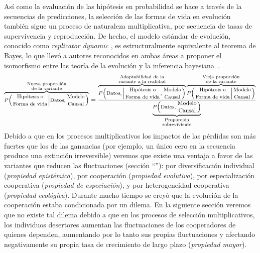 \documentclass[a4paper,11pt]{book}
\newcommand\hfrac[2]{\genfrac{}{}{0pt}{}{#1}{#2}} %
\theoremstyle{definition}
\begin{document}
Así como la evaluación de las hipótesis en probabilidad se hace a través de la secuencias de predicciones, la selección de las formas de vida en evolución también sigue un proceso de naturaleza multiplicativa, por secuencia de tasas de supervivencia y reproducción.
%
De hecho, el modelo estándar de evolución, conocido como \emph{replicator dynamic} \cite{taylor1978-replicatorDynamic}, es estructuralmente equivalente al teorema de Bayes, lo que llevó a autores reconocidos en ambas áreas a proponer el isomorfismo entre las teoría de la evolución y la inferencia bayesiana~\cite{czegel2019-bayesianEvolution, czegel2022-bayesDarwin}.
%
\begin{equation*} \footnotesize
\overbrace{P\Big(\hfrac{\text{Hipótesis o}}{\text{Forma de vida}}  \Big| \text{Datos}, \hfrac{\text{Modelo}}{\text{Causal}} \Big)}^{\hfrac{\text{\scriptsize Nueva proporción}}{\text{\scriptsize de la variante}}} = \frac{ \overbrace{P\Big(\text{Datos},  \Big|  \hfrac{\text{Hipótesis o}}{\text{Forma de vida}}  , \hfrac{\text{Modelo}}{\text{Causal}} \Big)}^{\hfrac{\text{\scriptsize Adaptabilidad de la}}{\text{\scriptsize variante a la realidad}}} \overbrace{P\Big(\hfrac{\text{Hipótesis o}}{\text{Forma de vida}} \Big|  \hfrac{\text{Modelo}}{\text{Causal}} \Big)}^{\hfrac{\text{\scriptsize Vieja proporción}}{\text{\scriptsize de la variante}}}}{\underbrace{P\Big(\text{Datos},  \hfrac{\text{\small Modelo}}{\text{\small Causal}} \Big)}_{\hfrac{\text{\scriptsize Proporción}}{\text{\scriptsize sobreviviente}}}}
\end{equation*}
%
Debido a que en los procesos multiplicativos los impactos de las pérdidas son más fuertes que los de las ganancias (por ejemplo, un único cero en la secuencia produce una extinción irreversible) veremos que existe una ventaja a favor de las variantes que reducen las fluctuaciones (sección ``''): por diversificación individual (\emph{propiedad epistémica}), por cooperación (\emph{propiedad evolutiva}), por especialización cooperativa (\emph{propiedad de especiación}), y por heterogeneidad cooperativa (\emph{propiedad ecológica}).
%
Durante mucho tiempo se creyó que la evolución de la cooperación estaba condicionada por un dilema.
%
En la siguiente sección veremos que no existe tal dilema debido a que en los procesos de selección multiplicativos, los individuos desertores aumentan las fluctuaciones de los cooperadores de quienes dependen, aumentando por lo tanto sus propias fluctuaciones y afectando negativamente su propia tasa de crecimiento de largo plazo (\emph{propiedad mayor}).
\end{document}
